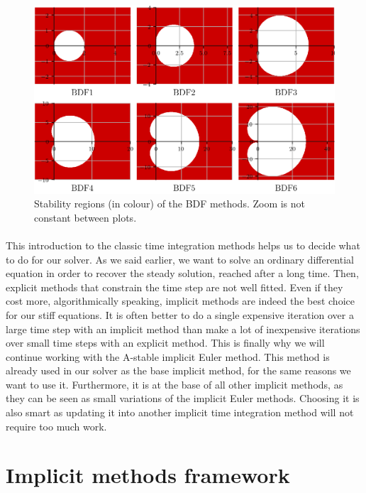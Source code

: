         \begin{figure}
          \centering
          \includegraphics{figures/bdf_stab.png}
          \caption{Stability regions (in colour) of the BDF methods. Zoom is not constant between plots.}
          \label{fig:bdf_stab}
        \end{figure}

      \paragraph{}
      This introduction to the classic time integration methods helps us to decide what to do for our solver.
      As we said earlier, we want to solve an ordinary differential equation in order to recover the steady solution, reached after a long time.
      Then, explicit methods that constrain the time step are not well fitted.
      Even if they cost more, algorithmically speaking, implicit methods are indeed the best choice for our stiff equations.
      It is often better to do a single expensive iteration over a large time step with an implicit method than make a lot of inexpensive iterations over small time steps with an explicit method.
      This is finally why we will continue working with the A-stable implicit Euler method.
      This method is already used in our solver as the base implicit method, for the same reasons we want to use it.
      Furthermore, it is at the base of all other implicit methods, as they can be seen as small variations of the implicit Euler methods.
      Choosing it is also smart as updating it into another implicit time integration method will not require too much work.


  \section{Implicit methods framework}

